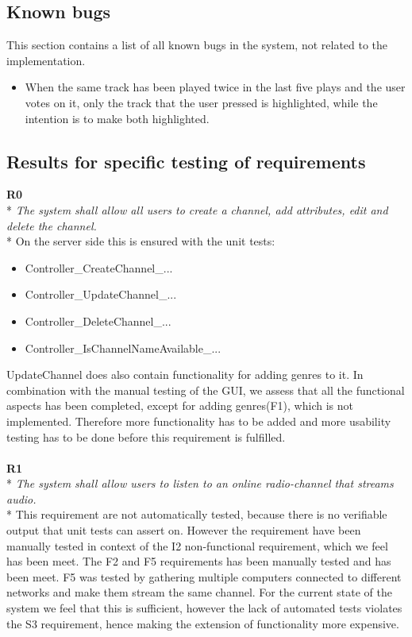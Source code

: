 \documentclass[a4paper,11pt,report]{article}
\begin{document}
{\subsection{Known bugs}
This section contains a list of all known bugs in the system, not related to the implementation.
\begin{itemize}
\item When the same track has been played twice in the last five plays and the user votes on it, only the track that the user pressed is highlighted, while the intention is to make both highlighted.
\end{itemize}

\subsection{Results for specific testing of requirements}
\textbf{R0} \\*
\textit{The system shall allow all users to create a channel, add attributes, edit and delete the channel.} \\*
On the server side this is ensured with the unit tests:
\begin{itemize}
\item Controller\_CreateChannel\_...
\item Controller\_UpdateChannel\_...
\item Controller\_DeleteChannel\_...
\item Controller\_IsChannelNameAvailable\_...
\end{itemize}
UpdateChannel does also contain functionality for adding genres to it. In combination with the manual testing of the GUI, we assess that all the functional aspects has been completed, except for adding genres(F1), which is not implemented. Therefore more functionality has to be added and more usability testing has to be done before this requirement is fulfilled.\\ \\
\textbf{R1} \\*
\textit{The system shall allow users to listen to an online radio-channel that streams audio.} \\*
This requirement are not automatically tested, because there is no verifiable output that unit tests can assert on. However the requirement have been manually tested in context of the I2 non-functional requirement, which we feel has been meet. The F2 and F5 requirements has been manually tested and has been meet. F5 was tested by gathering multiple computers connected to different networks and make them stream the same channel. For the current state of the system we feel that this is sufficient, however the lack of automated tests violates the S3 requirement, hence making the extension of functionality more expensive. \\ \\
}
\end{document}
